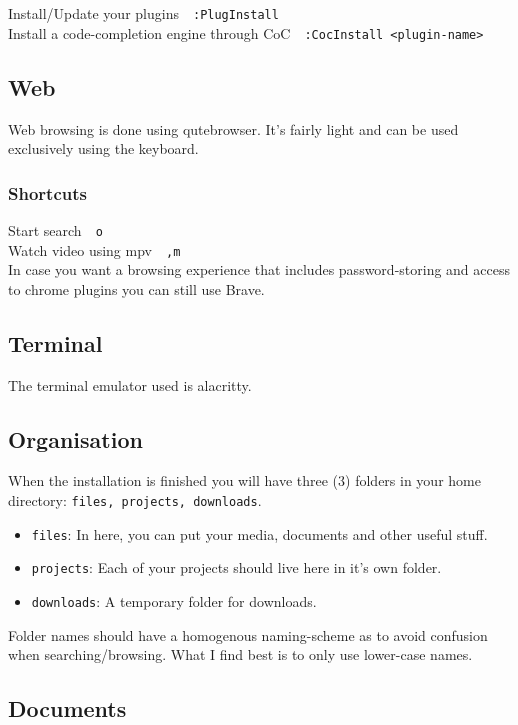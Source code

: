 \documentclass{article}
\let\src\texttt
\newcommand{\shortcut}[2]{#1~\dotfill{}~\src{#2}\\} %
\newcommand{\terminalemulator}{alacritty}
\newcommand{\browser}{qutebrowser}
\newcommand{\altbrowser}{Brave}
\newcommand{\videoplayer}{mpv}
\begin{document}
\shortcut{Install/Update your plugins}{:PlugInstall}
\shortcut{Install a code-completion engine through CoC}{:CocInstall \textless plugin-name\textgreater}

\subsection{Web}

Web browsing is done using \browser. It's fairly light and can be used 
exclusively using the keyboard.

\subsubsection{Shortcuts}

\shortcut{Start search}{o}
\shortcut{Watch video using \videoplayer}{,m}

In case you want a browsing experience that includes password-storing 
and access to chrome plugins you can still use \altbrowser.

\subsection{Terminal}

The terminal emulator used is \terminalemulator.

\subsection{Organisation}

When the installation is finished you will have three (3)
folders in your home directory: \src{files, projects, downloads}.

\begin{itemize}
    \item \src{files}: In here, you can put your media, documents and other useful stuff.
    \item \src{projects}: Each of your projects should live here in it's own folder.
    \item \src{downloads}: A temporary folder for downloads.
\end{itemize}

Folder names should have a homogenous naming-scheme as to avoid confusion when 
searching/browsing. What I find best is to only use lower-case names.

\subsection{Documents}
\end{document}
